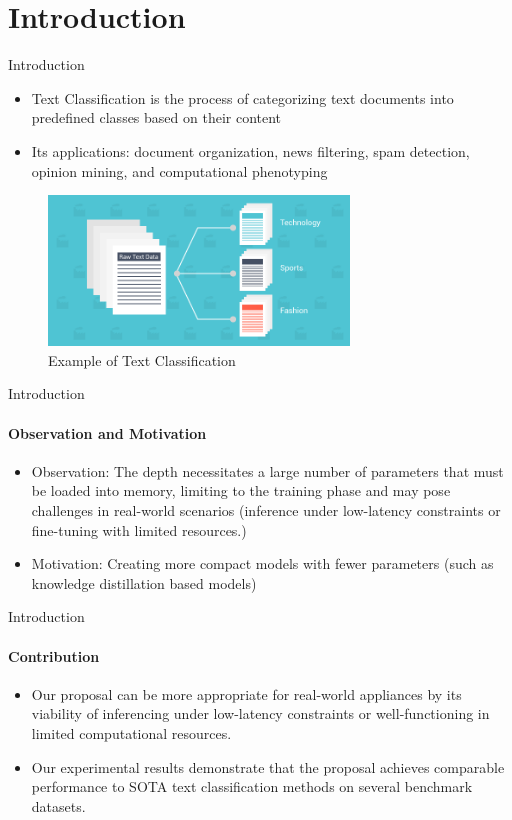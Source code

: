 \section{Introduction}
\begin{frame}{Introduction}
\begin{itemize}
\item Text Classification is the process of categorizing text documents into predefined classes based on their content
\item Its applications: document organization, news filtering, spam detection, opinion mining, and computational phenotyping
\end{itemize}

\begin{figure}
\centering
\includegraphics[width=80mm,scale=0.7]{img/TC_example.png}
\caption{Example of Text Classification}
\label{fig:example}
\end{figure}



\end{frame}

\begin{frame}{Introduction}
    \framesubtitle{Observation and Motivation}
\begin{itemize}
    \item Observation: The depth necessitates a large number of parameters that must be loaded into memory, limiting to the training phase and may pose challenges in real-world scenarios (inference under low-latency constraints or fine-tuning with limited resources.)
    \item Motivation: Creating more compact models with fewer parameters (such as knowledge distillation based models)
\end{itemize}
\end{frame}

\begin{frame}{Introduction}
\framesubtitle{Contribution}
\begin{itemize}
\item Our proposal can be more appropriate for real-world appliances by its viability of inferencing under low-latency constraints or well-functioning in limited computational resources.
\item Our experimental results demonstrate that the proposal achieves comparable performance to SOTA text classification methods on several benchmark datasets.
\end{itemize}
    
\end{frame}